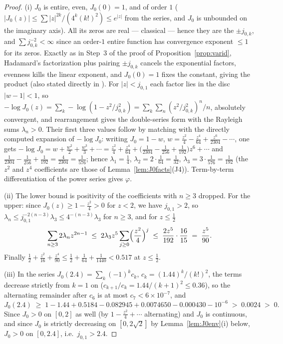 \documentclass[11pt]{article}
\begin{document}
\begin{proof}
(i) $J_0$ is entire, even, $J_0(0)=1$, and of order $1$
($|J_0(z)|\le\sum|z|^{2k}/(4^k(k!)^2)\le e^{|z|}$ from the series,
and $J_0$ is unbounded on the imaginary axis). All its zeros are real
--- classical \cite[Ch.~XV]{Wat44} --- hence they are the
$\pm j_{0,k}$, and $\sum j_{0,k}^{-2}<\infty$ since an order-$1$
entire function has convergence exponent $\le1$ for its zeros. Exactly
as in Step~3 of the proof of Proposition~\ref{prop:varid}, Hadamard's
factorization plus pairing $\pm j_{0,k}$ cancels the exponential
factors, evenness kills the linear exponent, and $J_0(0)=1$ fixes the
constant, giving the product (also stated directly in
\cite[Ch.~XV]{Wat44}). For $|z|<j_{0,1}$ each factor lies in the disc
$|w-1|<1$, so
$-\log J_0(z)=\sum_k-\log(1-z^2/j_{0,k}^2)
=\sum_k\sum_n(z^2/j_{0,k}^2)^n/n$, absolutely convergent, and
rearrangement gives the double-series form with the Rayleigh sums
$\lambda_n>0$. Their first three values follow by matching with the
directly computed expansion of $-\log J_0$: writing $J_0=1-w$,
$w=\tfrac{z^2}4-\tfrac{z^4}{64}+\tfrac{z^6}{2304}-\cdots$, one gets
$-\log J_0=w+\tfrac{w^2}2+\tfrac{w^3}3+\cdots
=\tfrac{z^2}4+\tfrac{z^4}{64}+\bigl(\tfrac1{2304}-\tfrac1{256}
+\tfrac1{192}\bigr)z^6+\cdots$ and
$\tfrac1{2304}-\tfrac1{256}+\tfrac1{192}=\tfrac{4}{2304}
=\tfrac1{576}$; hence $\lambda_1=\tfrac14$,
$\lambda_2=2\cdot\tfrac1{64}=\tfrac1{32}$,
$\lambda_3=3\cdot\tfrac1{576}=\tfrac1{192}$ (the $z^2$ and $z^4$
coefficients are those of Lemma~\ref{lem:J0facts}(J4)).
Term-by-term differentiation of the power series gives $\varphi$.

(ii) The lower bound is positivity of the coefficients with $n\ge3$
dropped. For the upper: since $J_0(z)\ge1-\tfrac{z^2}4>0$ for $z<2$,
we have $j_{0,1}>2$, so $\lambda_n\le j_{0,1}^{-2(n-3)}\lambda_3
\le4^{-(n-3)}\lambda_3$ for $n\ge3$, and for $z\le\tfrac12$
\[
\sum_{n\ge3}2\lambda_nz^{2n-1}
\;\le\;2\lambda_3z^5\sum_{j\ge0}\Bigl(\frac{z^2}4\Bigr)^{j}
\;\le\;\frac{2z^5}{192}\cdot\frac{16}{15}\;=\;\frac{z^5}{90}.
\]
Finally $\tfrac12+\tfrac{z^2}{16}+\tfrac{z^4}{90}
\le\tfrac12+\tfrac1{64}+\tfrac1{1440}<0.517$ at $z\le\tfrac12$.

(iii) In the series $J_0(2.4)=\sum_k(-1)^kc_k$,
$c_k=(1.44)^k/(k!)^2$, the terms decrease strictly from $k=1$ on
($c_{k+1}/c_k=1.44/(k+1)^2\le0.36$), so the alternating remainder
after $c_6$ is at most $c_7<6\times10^{-7}$, and
\[
J_0(2.4)\;\ge\;1-1.44+0.5184-0.082945+0.0074650-0.000430-10^{-6}
\;>\;0.0024\;>\;0 .
\]
Since $J_0>0$ on $[0,2]$ as well (by $1-\tfrac{z^2}4+\cdots$
alternating) and $J_0$ is continuous, and since $J_0$ is strictly
decreasing on $[0,2\sqrt2]$ by Lemma~\ref{lem:J0env}(i) below, $J_0>0$
on $[0,2.4]$, i.e.\ $j_{0,1}>2.4$.
\end{proof}
\end{document}
